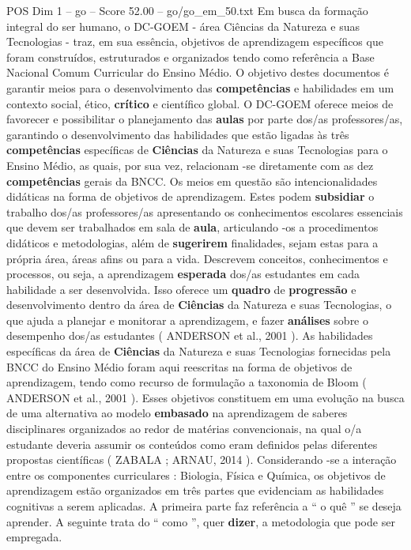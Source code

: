 \begin{textsample}{POS Dim 1 – go – Score 52.00 – go/go\_em\_50.txt}
Em busca da formação integral do ser humano, o DC-GOEM - área Ciências da Natureza e suas Tecnologias - traz, em sua essência, objetivos de aprendizagem específicos que foram construídos, estruturados e organizados tendo como referência a Base Nacional Comum Curricular do Ensino Médio.
O objetivo destes documentos é garantir meios para o desenvolvimento das \textbf{competências} e habilidades em um contexto social, ético, \textbf{crítico} e científico global.
O DC-GOEM oferece meios de favorecer e possibilitar o planejamento das \textbf{aulas} por parte dos/as professores/as, garantindo o desenvolvimento das habilidades que estão ligadas às três \textbf{competências} específicas de \textbf{Ciências} da Natureza e suas Tecnologias para o Ensino Médio, as quais, por sua vez, relacionam -se diretamente com as dez \textbf{competências} gerais da BNCC.
Os meios em questão são intencionalidades didáticas na forma de objetivos de aprendizagem.
Estes podem \textbf{subsidiar} o trabalho dos/as professores/as apresentando os conhecimentos escolares essenciais que devem ser trabalhados em sala de \textbf{aula}, articulando -os a procedimentos didáticos e metodologias, além de \textbf{sugerirem} finalidades, sejam estas para a própria área, áreas afins ou para a vida.
Descrevem conceitos, conhecimentos e processos, ou seja, a aprendizagem \textbf{esperada} dos/as estudantes em cada habilidade a ser desenvolvida.
Isso oferece um \textbf{quadro} de \textbf{progressão} e desenvolvimento dentro da área de \textbf{Ciências} da Natureza e suas Tecnologias, o que ajuda a planejar e monitorar a aprendizagem, e fazer \textbf{análises} sobre o desempenho dos/as estudantes ( ANDERSON et al., 2001 ).
As habilidades específicas da área de \textbf{Ciências} da Natureza e suas Tecnologias fornecidas pela BNCC do Ensino Médio foram aqui reescritas na forma de objetivos de aprendizagem, tendo como recurso de formulação a taxonomia de Bloom ( ANDERSON et al., 2001 ).
Esses objetivos constituem em uma evolução na busca de uma alternativa ao modelo \textbf{embasado} na aprendizagem de saberes disciplinares organizados ao redor de matérias convencionais, na qual o/a estudante deveria assumir os conteúdos como eram definidos pelas diferentes propostas científicas ( ZABALA ; ARNAU, 2014 ).
Considerando -se a interação entre os componentes curriculares : Biologia, Física e Química, os objetivos de aprendizagem estão organizados em três partes que evidenciam as habilidades cognitivas a serem aplicadas.
A primeira parte faz referência a “ o quê ” se deseja aprender.
A seguinte trata do “ como ”, quer \textbf{dizer}, a metodologia que pode ser empregada.

\end{textsample}
